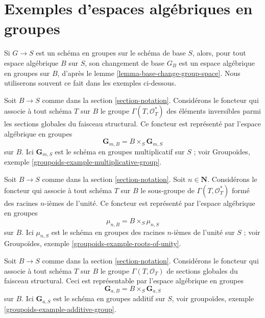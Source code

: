 \section{Exemples d'espaces algébriques en groupes}
\label{section-examples-group-spaces}

\noindent
Si $G \to S$ est un schéma en groupes sur le schéma de base $S$, alors, pour tout espace algébrique $B$ sur $S$, son changement de base $G_B$ est un espace algébrique en groupes sur $B$, d'après le lemme \ref{lemma-base-change-group-space}. Nous utiliserons souvent ce fait dans les exemples ci-dessous.

\begin{example}
\label{example-multiplicative-group}
Soit $B \to S$ comme dans la section \ref{section-notation}. Considérons le foncteur qui associe à tout schéma $T$ sur $B$ le groupe $\Gamma(T, \mathcal{O}_T^*)$ des éléments inversibles parmi les sections globales du faisceau structural. Ce foncteur est représenté par l'espace algébrique en groupes
$$
\mathbf{G}_{m, B} = B \times_S \mathbf{G}_{m, S}
$$
sur $B$. Ici $\mathbf{G}_{m, S}$ est le schéma en groupes multiplicatif sur $S$ ; voir Groupoïdes, exemple \ref{groupoids-example-multiplicative-group}.
\end{example}

\begin{example}
\label{example-roots-of-unity}
Soit $B \to S$ comme dans la section \ref{section-notation}. Soit $n \in \mathbf{N}$. Considérons le foncteur qui associe à tout schéma $T$ sur $B$ le sous-groupe de $\Gamma(T, \mathcal{O}_T^*)$ formé des racines $n$-ièmes de l'unité. Ce foncteur est représenté par l'espace algébrique en groupes
$$
\mu_{n, B} = B \times_S \mu_{n, S}
$$
sur $B$. Ici $\mu_{n, S}$ est le schéma en groupes des racines $n$-ièmes de l'unité sur $S$ ; voir Groupoïdes, exemple \ref{groupoids-example-roots-of-unity}.
\end{example}

\begin{example}
\label{example-additive-group}
Soit $B \to S$ comme dans la section \ref{section-notation}. Considérons le foncteur qui associe à tout schéma $T$ sur $B$ le groupe $\Gamma(T, \mathcal{O}_T)$ de sections globales du faisceau structural. Ceci est représentable par l'espace algébrique en groupes
$$
\mathbf{G}_{a, B} = B \times_S \mathbf{G}_{a, S}
$$
sur $B$. Ici $\mathbf{G}_{a, S}$ est le schéma en groupes additif sur $S$, voir groupoïdes, exemple \ref{groupoids-example-additive-group}.
\end{example}

